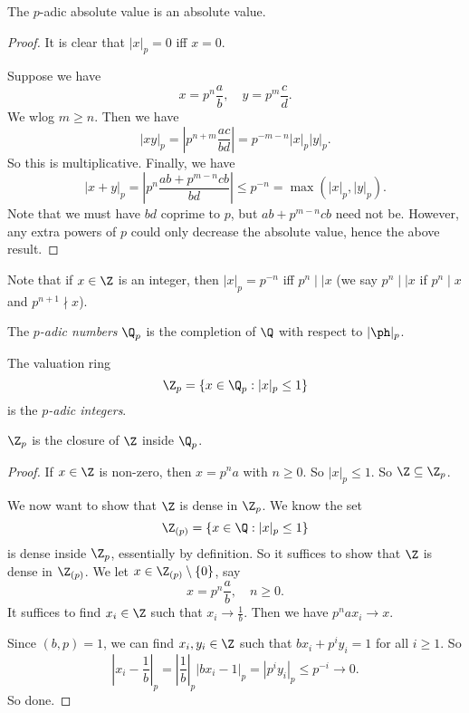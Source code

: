 \documentclass[a4paper]{article}
\begin{document}
\begin{prop}
  The $p$-adic absolute value is an absolute value.
\end{prop}

\begin{proof}
  It is clear that $|x|_p = 0$ iff $x = 0$.

  Suppose we have
  \[
    x = p^n \frac{a}{b},\quad y = p^m \frac{c}{d}.
  \]
  We wlog $m \geq n$. Then we have
  \[
    |xy|_p = \left|p^{n + m}\frac{ac}{bd}\right| = p^{-m-n}|x|_p |y|_p.
  \]
  So this is multiplicative. Finally, we have
  \[
    |x + y|_p = \left|p^n \frac{ab + p^{m - n}cb}{bd}\right| \leq p^{-n} = \max(|x|_p, |y|_p).
  \]
  Note that we must have $bd$ coprime to $p$, but $ab + p^{m - n}cb$ need not be. However, any extra powers of $p$ could only decrease the absolute value, hence the above result.
\end{proof}

Note that if $x \in \Z$ is an integer, then $|x|_p = p^{-n}$ iff $p^n \mid\mid x$ (we say $p^n \mid\mid x$ if $p^n \mid x$ and $p^{n + 1} \nmid x$).

\begin{defi}
  The \emph{$p$-adic numbers} $\Q_p$ is the completion of $\Q$ with respect to $|\ph|_p$.
\end{defi}

\begin{defi}
  The valuation ring
  \[
    \Z_p = \{x \in \Q_p: |x|_p \leq 1\}
  \]
  is the \emph{$p$-adic integers}.
\end{defi}

\begin{prop}
  $\Z_p$ is the closure of $\Z$ inside $\Q_p$.
\end{prop}

\begin{proof}
  If $x \in \Z$ is non-zero, then $x = p^na$ with $n \geq 0$. So $|x|_p \leq 1$. So $\Z \subseteq \Z_p$.

  We now want to show that $\Z$ is dense in $\Z_p$. We know the set
  \[
    \Z_{(p)} = \{x \in \Q: |x|_p \leq 1\}
  \]
  is dense inside $\Z_p$, essentially by definition. So it suffices to show that $\Z$ is dense in $\Z_{(p)}$. We let $x \in \Z_{(p)} \setminus\{0\}$, say
  \[
    x = p^n \frac{a}{b},\quad n \geq 0.
  \]
  It suffices to find $x_i \in \Z$ such that $x_i \to \frac{1}{b}$. Then we have $p^n ax_i \to x$.

  Since $(b, p) = 1$, we can find $x_i, y_i \in \Z$ such that $b x_i + p^i y_i = 1$ for all $i \geq 1$. So
  \[
    \left|x_i - \frac{1}{b}\right|_p = \left|\frac{1}{b}\right|_p |bx_i - 1|_p = |p^i y_i|_p \leq p^{-i} \to 0.
  \]
  So done.
\end{proof}
\end{document}
